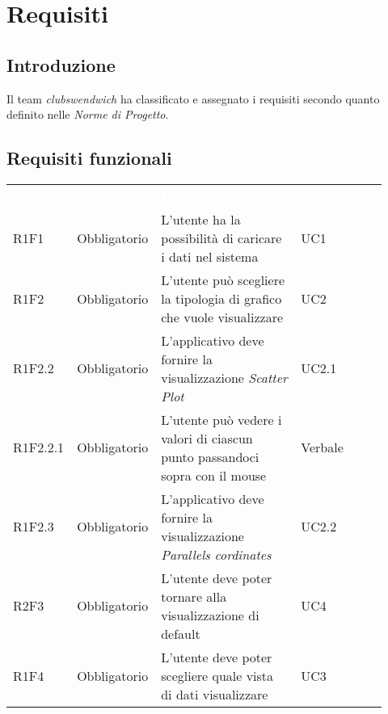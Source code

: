 \section{Requisiti}
\subsection{Introduzione}
Il team \textit{clubswendwich} ha classificato e assegnato i requisiti secondo quanto definito nelle \textit{Norme di Progetto}. 
\subsection{Requisiti funzionali}
{\renewcommand{\arraystretch}{1.5}
\begin{tabular}{p{0.12\linewidth}p{0.15\linewidth}p{0.50\linewidth}p{0.15\linewidth}}
	\rowcolor[RGB]{33, 73, 50}
	\textcolor{white}{\textbf{Codice}} & \textcolor{white}{\textbf{Classe}} & \textcolor{white}{\textbf{Descrizione}} &
    \textcolor{white}{\textbf{Riferimenti}}\\
    \rowcolor[RGB]{216, 235, 171}
    R1F1 & Obbligatorio & L'utente ha la possibilità di caricare i dati nel sistema & UC1\\
    \rowcolor[RGB]{233, 245, 206}
    R1F2 & Obbligatorio & L'utente può scegliere la tipologia di grafico che vuole visualizzare & UC2\\
    \rowcolor[RGB]{216, 235, 171}
    R1F2.2 & Obbligatorio & L'applicativo deve fornire la visualizzazione \textit{Scatter Plot} & UC2.1\\
    \rowcolor[RGB]{233, 245, 206}
    R1F2.2.1 & Obbligatorio & L'utente può vedere i valori di ciascun punto passandoci sopra con il mouse & Verbale\\
    \rowcolor[RGB]{216, 235, 171}
    R1F2.3 & Obbligatorio & L'applicativo deve fornire la visualizzazione \textit{Parallels cordinates} & UC2.2\\
    \rowcolor[RGB]{233, 245, 206}
    R2F3 & Obbligatorio & L'utente deve poter tornare alla visualizzazione di default & UC4\\
    \rowcolor[RGB]{216, 235, 171}
    R1F4 & Obbligatorio & L'utente deve poter scegliere quale vista di dati visualizzare & UC3\\
\end{tabular}	
}